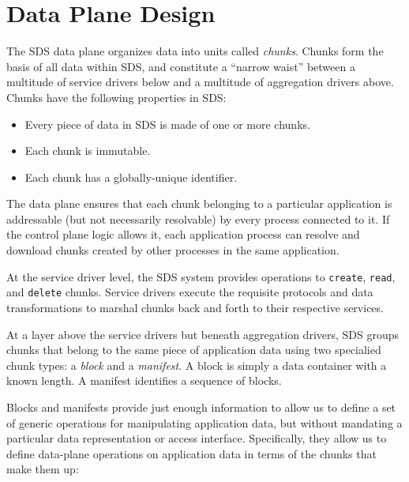 \section{Data Plane Design}

The SDS data plane organizes data into units called \emph{chunks}.  Chunks form
the basis of all data within SDS, and constitute a ``narrow waist'' between 
a multitude of service drivers below and a multitude of aggregation drivers
above.  Chunks have the following properties in SDS:

\begin{itemize}
    \item Every piece of data in SDS is made of one or more chunks.
    \item Each chunk is immutable.
    \item Each chunk has a globally-unique identifier.
\end{itemize}

The data plane ensures that each chunk belonging to a particular application
is addressable (but not necessarily resolvable) by every process connected to it.
If the control plane logic allows it, each application
process can resolve and download chunks created by other processes in the same
application.


At the service driver level, the SDS
system provides operations to \texttt{create}, \texttt{read}, and
\texttt{delete} chunks.  Service drivers execute the requisite protocols
and data transformations to
marshal chunks back and forth to their respective services.

At a layer above the service drivers but beneath aggregation drivers, SDS
groups chunks that belong to the same piece of application data using two specialied
chunk types:  a \emph{block} and a \emph{manifest}.  A block is simply a data
container with a known length.  A manifest identifies a sequence of blocks.

Blocks and manifests provide just enough information to allow us to define a
set of generic operations for manipulating application data, but
without mandating a particular data representation or access interface.
Specifically, they allow us to define data-plane operations on
application data in terms of the chunks that make them up:

